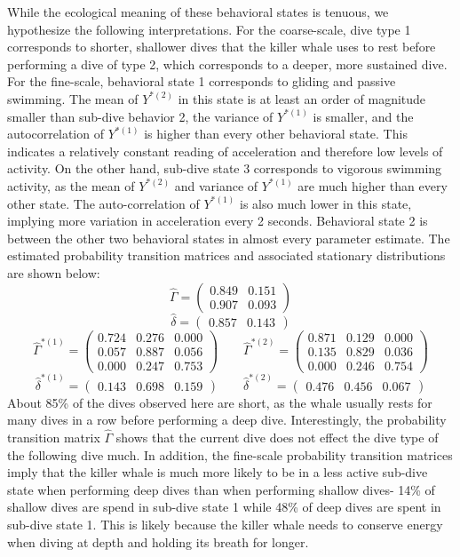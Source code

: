 %
While the ecological meaning of these behavioral states is tenuous, we hypothesize the following interpretations. For the coarse-scale, dive type 1 corresponds to shorter, shallower dives that the killer whale uses to rest before performing a dive of type 2, which corresponds to a deeper, more sustained dive. For the fine-scale, behavioral state 1 corresponds to gliding and passive swimming. The mean of $Y^{*(2)}$ in this state is at least an order of magnitude smaller than sub-dive behavior 2, the variance of $Y^{*(1)}$ is smaller, and the autocorrelation of $Y^{*(1)}$ is higher than every other behavioral state.  This indicates a relatively constant reading of acceleration and therefore low levels of activity. On the other hand, sub-dive state 3 corresponds to vigorous swimming activity, as the mean of $Y^{*(2)}$ and variance of $Y^{*(1)}$ are much higher than every other state. The auto-correlation of $Y^{*(1)}$ is also much lower in this state, implying more variation in acceleration every 2 seconds. Behavioral state 2 is between the other two behavioral states in almost every parameter estimate.
The estimated probability transition matrices and associated stationary distributions are shown below:
%
$$\hat \Gamma = \begin{pmatrix} 
0.849 & 0.151 \\
0.907 & 0.093
\end{pmatrix}$$
$$\hat \delta = \begin{pmatrix} 0.857 & 0.143 \end{pmatrix}$$
%
$$\hat \Gamma^{*(1)} = \begin{pmatrix} 
0.724 & 0.276 & 0.000 \\
0.057 & 0.887 & 0.056 \\
0.000 & 0.247 & 0.753
\end{pmatrix} \qquad 
\hat \Gamma^{*(2)} = \begin{pmatrix} 
0.871 & 0.129 & 0.000 \\
0.135 & 0.829 & 0.036 \\
0.000 & 0.246 & 0.754
\end{pmatrix}$$
$$\hat \delta^{*(1)} = \begin{pmatrix} 0.143 & 0.698 & 0.159 \end{pmatrix} \qquad
\hat \delta^{*(2)} = \begin{pmatrix} 0.476 & 0.456 & 0.067 \end{pmatrix}$$
%
About 85\% of the dives observed here are short, as the whale usually rests for many dives in a row before performing a deep dive. Interestingly, the probability transition matrix $\hat \Gamma$ shows that the current dive does not effect the dive type of the following dive much. In addition, the fine-scale probability transition matrices imply that the killer whale is much more likely to be in a less active sub-dive state when performing deep dives than when performing shallow dives- 14\% of shallow dives are spend in sub-dive state 1 while 48\% of deep dives are spent in sub-dive state 1. This is likely because the killer whale needs to conserve energy when diving at depth and holding its breath for longer.

